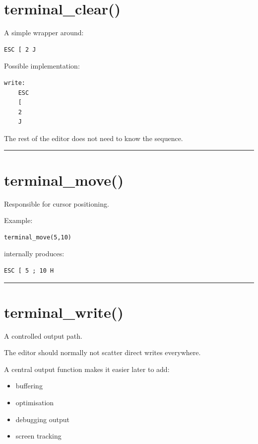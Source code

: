 \documentclass[
  oneside,
  openany]{book}
\providecommand{\tightlist}{%
  \setlength{\itemsep}{0pt}\setlength{\parskip}{0pt}}
\begin{document}
\hypertarget{terminal_clear}{%
\section{terminal\_clear()}\label{terminal_clear}}

A simple wrapper around:

\begin{verbatim}
ESC [ 2 J
\end{verbatim}

Possible implementation:

\begin{verbatim}
write:
    ESC
    [
    2
    J
\end{verbatim}

The rest of the editor does not need to know the sequence.

\begin{center}\rule{0.5\linewidth}{0.5pt}\end{center}

\hypertarget{terminal_move}{%
\section{terminal\_move()}\label{terminal_move}}

Responsible for cursor positioning.

Example:

\begin{verbatim}
terminal_move(5,10)
\end{verbatim}

internally produces:

\begin{verbatim}
ESC [ 5 ; 10 H
\end{verbatim}

\begin{center}\rule{0.5\linewidth}{0.5pt}\end{center}

\hypertarget{terminal_write}{%
\section{terminal\_write()}\label{terminal_write}}

A controlled output path.

The editor should normally not scatter direct writes everywhere.

A central output function makes it easier later to add:

\begin{itemize}
\tightlist
\item
  buffering
\item
  optimisation
\item
  debugging output
\item
  screen tracking
\end{itemize}
\end{document}
